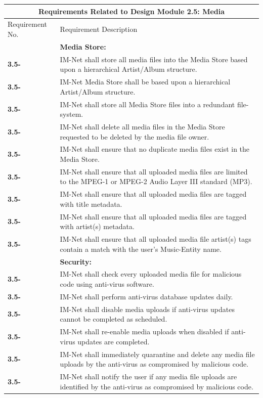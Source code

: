 \documentclass[letterpaper,12pt]{article}
\newcounter{rcounter}						%
\newcommand\rnumber{\stepcounter{rcounter}\arabic{rcounter}}
\begin{document}
{\setcounter{rcounter}{0}
\begin{center}
\begin{tabular}{|l|p{6in}|}
\hline 
\multicolumn{2}{|c|}{\textbf{Requirements Related to Design Module 2.5: Media}} \\ 
\hline 
Requirement No. & Requirement Description \\
\hline
& \textbf{Media Store:} \\
\hline
\textbf{3.5-\rnumber} & IM-Net shall store all media files into the Media Store based upon a hierarchical Artist/Album structure. \\ 
\hline
\textbf{3.5-\rnumber} & IM-Net Media Store shall be based upon a hierarchical Artist/Album structure. \\ 
\hline
\textbf{3.5-\rnumber} & IM-Net shall store all Media Store files into a redundant file-system. \\ 
\hline
\textbf{3.5-\rnumber} & IM-Net shall delete all media files in the Media Store requested to be deleted by the media file owner. \\ 
\hline
\textbf{3.5-\rnumber} & IM-Net shall ensure that no duplicate media files exist in the Media Store. \\ 
\hline
\textbf{3.5-\rnumber} & IM-Net shall ensure that all uploaded media files are limited to the MPEG-1 or MPEG-2 Audio Layer III standard (MP3). \\ 
\hline
\textbf{3.5-\rnumber} & IM-Net shall ensure that all uploaded media files are tagged with title metadata. \\ 
\hline
\textbf{3.5-\rnumber} & IM-Net shall ensure that all uploaded media files are tagged with artist(s) metadata. \\ 
\hline
\textbf{3.5-\rnumber} & IM-Net shall ensure that all uploaded media file artist(s) tags contain a match with the user's Music-Entity name. \\ 
\hline
& \textbf{Security:} \\
\hline
\textbf{3.5-\rnumber} & IM-Net shall check every uploaded media file for malicious code using anti-virus software. \\ 
\hline
\textbf{3.5-\rnumber} & IM-Net shall perform anti-virus database updates daily.\\ 
\hline
\textbf{3.5-\rnumber} & IM-Net shall disable media uploads if anti-virus updates cannot be completed as scheduled. \\ 
\hline 
\textbf{3.5-\rnumber} & IM-Net shall re-enable media uploads when disabled if anti-virus updates are completed. \\ 
\hline
\textbf{3.5-\rnumber} & IM-Net shall immediately quarantine and delete any media file uploads by the anti-virus as compromised by malicious code. \\ 
\hline
\textbf{3.5-\rnumber} & IM-Net shall notify the user if any media file uploads are identified by the anti-virus as compromised by malicious code. \\ 
\hline
\end{tabular} 
\end{center}

}
\end{document}
